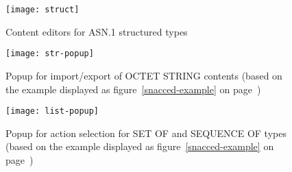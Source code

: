 \begin{figure}
\begin{center}
\texttt{[image: struct]}
\caption{Content editors for ASN.1 structured types}
\label{struct-content}
\end{center}
\end{figure}

\def\exref{ (based on the example displayed as figure~\ref{snacced-example} on page~\pageref{snacced-example})}

\begin{figure}
\begin{center}
\texttt{[image: str-popup]}
\caption[Popup for import/export of OCTET STRING contents]{Popup for import/export of OCTET STRING contents\exref}
\label{str-popup}
\end{center}
\end{figure}

\begin{figure}
\begin{center}
\texttt{[image: list-popup]}
\caption[Popup for action selection for SET OF and SEQUENCE OF types]{Popup for action selection for SET OF and SEQUENCE OF types\exref}
\label{list-popup}
\end{center}
\end{figure}

